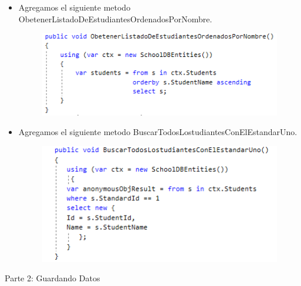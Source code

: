 \begin{itemize}
\begin{figure}[htb]
\begin{center}
\end{center}
\end{figure}
	\item Agregamos el siguiente metodo ObetenerListadoDeEstudiantesOrdenadosPorNombre.
\begin{figure}[htb]
\begin{center}
\includegraphics[width=12cm]{./Imagenes/1-4}
\end{center}
\end{figure}
	\item Agregamos el siguiente metodo BuscarTodosLostudiantesConElEstandarUno.
\begin{figure}[htb]
\begin{center}
\includegraphics[width=12cm]{./Imagenes/1-5}
\end{center}
\end{figure}
\end{itemize}
Parte 2: Guardando Datos

